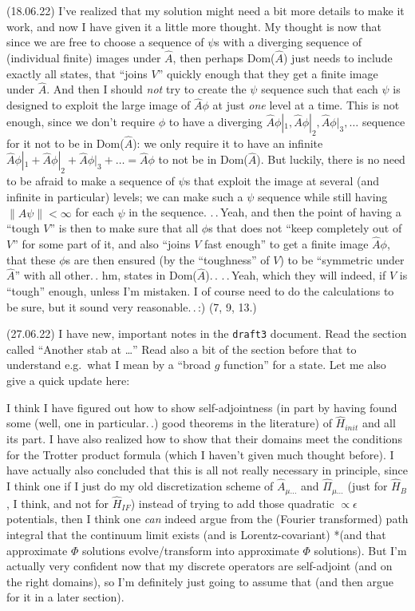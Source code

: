\documentclass{report}
\begin{document}
(18.06.22) I've realized that my solution might need a bit more details to make it work, and now I have given it a little more thought. My thought is now that since we are free to choose a sequence of $\psi$s with a diverging sequence of (individual finite) images under $\hat A$, then perhaps Dom($\hat A$) just needs to include exactly all states, that ``joins $V$'' quickly enough that they get a finite image under $\hat A$. And then I should \emph{not} try to create the $\psi$ sequence such that each $\psi$ is designed to exploit the large image of $\hat A \phi$ at just \emph{one} level at a time. This is not enough, since we don't require $\phi$ to have a diverging $\hat A \phi|_1, \hat A \phi|_2, \hat A \phi|_3, \ldots$ sequence for it not to be in Dom($\hat A$): we only require it to have an infinite $\hat A \phi|_1 + \hat A \phi|_2 + \hat A \phi|_3 + \ldots = \hat A \phi$ to not be in Dom($\hat A$). But luckily, there is no need to be afraid to make a sequence of $\psi$s that exploit the image at several (and infinite in particular) levels; we can make such a $\psi$ sequence while still having $\|\hat A \psi\|< \infty$ for each $\psi$ in the sequence. 
.\,.\,Yeah, and then the point of having a ``tough $V$'' is then to make sure that all $\phi$s that does not ``keep completely out of $V$'' for some part of it, and also ``joins $V$ fast enough'' to get a finite image $\hat A \phi$, that these $\phi$s are then ensured (by the ``toughness'' of $V$) to be ``symmetric under $\hat A$'' with all other.\,. hm, states in Dom($\hat A$).\,. .\,.\,Yeah, which they will indeed, if $V$ is ``tough'' enough, unless I'm mistaken. I of course need to do the calculations to be sure, but it sound very reasonable.\,.\,:) (7, 9, 13.) 


(27.06.22) I have new, important notes in the \texttt{draft3} document. Read the section called ``Another stab at \ldots'' Read also a bit of the section before that to understand e.g.\ what I mean by a ``broad $g$ function'' for a state. Let me also give a quick update here:

I think I have figured out how to show self-adjointness (in part by having found some (well, one in particular.\,.) good theorems in the literature) of $\hat H_{init}$ and all its part. I have also realized how to show that their domains meet the conditions for the Trotter product formula (which I haven't given much thought before). I have actually also concluded that this is all not really necessary in principle, since I think one if I just do my old discretization scheme of $\hat A_{\mu\ldots}$ and $\hat \Pi_{\mu\ldots}$ (just for $\hat H_{B}$, I think, and not for $\hat H_{IF}$) instead of trying to add those quadratic $\propto \epsilon$ potentials, then I think one \emph{can} indeed argue from the (Fourier transformed) path integral that the continuum limit exists (and is Lorentz-covariant) *(and that approximate $\Phi$ solutions evolve/transform into approximate $\Phi$ solutions). But I'm actually very confident now that my discrete operators are self-adjoint (and on the right domains), so I'm definitely just going to assume that (and then argue for it in a later section). %
\end{document}
